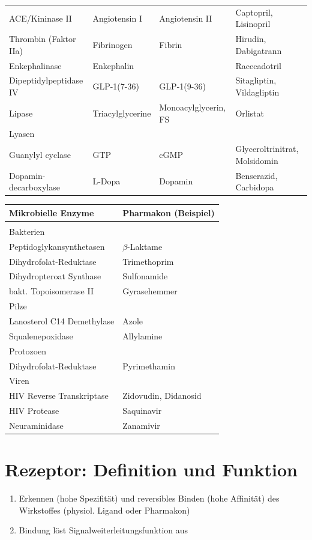 \documentclass[10pt,a4paper]{report}
\begin{document}
\begin{tabularx}{\textwidth}{X|X|X|X}
ACE/Kininase II&Angiotensin I&Angiotensin II&Captopril, Lisinopril\\
Thrombin (Faktor IIa)&Fibrinogen&Fibrin&Hirudin, Dabigatrann\\
Enkephalinase&Enkephalin&&Racecadotril\\
Dipeptidylpeptidase IV&GLP-1(7-36)&GLP-1(9-36)&Sitagliptin, Vildagliptin\\
Lipase&Triacylglycerine&Monoacylglycerin, FS&Orlistat\\
Lyasen&&&\\
Guanylyl cyclase&GTP&cGMP&Glyceroltrinitrat, Molsidomin\\
Dopamin-decarboxylase&L-Dopa&Dopamin&Benserazid, Carbidopa\\
\end{tabularx}
\begin{tabularx}{\textwidth}{X|X}
Mikrobielle Enzyme&Pharmakon (Beispiel)\\ \hline \\
Bakterien&\\
Peptidoglykansynthetasen&$\beta$-Laktame\\
Dihydrofolat-Reduktase&Trimethoprim\\
Dihydropteroat Synthase&Sulfonamide\\
bakt. Topoisomerase II&Gyrasehemmer\\
Pilze&\\  
Lanosterol C14 Demethylase&Azole\\
Squalenepoxidase&Allylamine\\
Protozoen&\\
Dihydrofolat-Reduktase&Pyrimethamin\\
Viren&\\
HIV Reverse Transkriptase&Zidovudin, Didanosid\\
HIV Protease&Saquinavir\\
Neuraminidase&Zanamivir\\
\end{tabularx}
\section{Rezeptor: Definition und Funktion}
\begin{enumerate}
	\item Erkennen (hohe Spezifität) und reversibles Binden (hohe Affinität) des Wirkstoffes (physiol. Ligand oder Pharmakon)
	\item Bindung löst Signalweiterleitungsfunktion aus
\end{enumerate}
\end{document}
